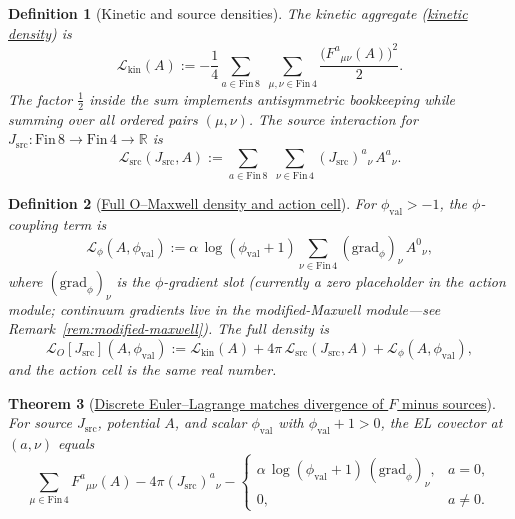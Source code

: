 \documentclass[11pt]{amsart}
\newtheorem{theorem}{Theorem}[section]
\newtheorem{definition}[theorem]{Definition}
\begin{document}
\begin{definition}[Kinetic and source densities]
\label{def:kinetic-source}
The kinetic aggregate (\hyperref[lean:LO-kinetic]{kinetic density}) is
\begin{equation}
\label{eq:Lkin-expanded}
\mathcal{L}_{\mathrm{kin}}(A)
:= -\frac14 \sum_{a\in \mathrm{Fin}\,8}\;\sum_{\mu,\nu\in \mathrm{Fin}\,4}
\frac{\bigl(F^a{}_{\mu\nu}(A)\bigr)^2}{2}.
\end{equation}
The factor \(\tfrac12\) inside the sum implements antisymmetric bookkeeping while summing over all ordered pairs \((\mu,\nu)\). The source interaction for \(J_{\mathrm{src}} : \mathrm{Fin}\,8 \to \mathrm{Fin}\,4 \to \mathbb{R}\) is
\begin{equation}
\label{eq:Lsource-expanded}
\mathcal{L}_{\mathrm{src}}(J_{\mathrm{src}},A)
:= \sum_{a\in \mathrm{Fin}\,8}\;\sum_{\nu\in \mathrm{Fin}\,4} (J_{\mathrm{src}})^a{}_\nu\, A^a{}_\nu .
\end{equation}
\end{definition}

\begin{definition}[\texorpdfstring{\hyperref[lean:LO-Maxwell]{Full O--Maxwell density and action cell}}{Full O-Maxwell density and action cell}]
\label{def:LOmaxwell}
For \(\phi_{\mathrm{val}}>-1\), the \(\phi\)-coupling term is
\[
\mathcal{L}_\phi(A,\phi_{\mathrm{val}})
:= \alpha\,\log(\phi_{\mathrm{val}}+1)\sum_{\nu\in \mathrm{Fin}\,4} (\mathrm{grad}_\phi)_\nu\, A^0{}_\nu ,
\]
where \((\mathrm{grad}_\phi)_\nu\) is the \(\phi\)-gradient slot (currently a zero placeholder in the action module; continuum gradients live in the modified-Maxwell module---see Remark~\ref{rem:modified-maxwell}). The full density is
\[
\mathcal{L}_O[J_{\mathrm{src}}](A,\phi_{\mathrm{val}})
:= \mathcal{L}_{\mathrm{kin}}(A) + 4\pi\,\mathcal{L}_{\mathrm{src}}(J_{\mathrm{src}},A) + \mathcal{L}_\phi(A,\phi_{\mathrm{val}}),
\]
and the \emph{action cell} is the same real number.
\end{definition}

\begin{theorem}[\texorpdfstring{\hyperref[lean:EL-divergence]{Discrete Euler--Lagrange matches divergence of \(F\) minus sources}}{Discrete Euler-Lagrange matches divergence of F minus sources}]
\label{thm:EL}
For source \(J_{\mathrm{src}}\), potential \(A\), and scalar \(\phi_{\mathrm{val}}\) with \(\phi_{\mathrm{val}}+1>0\), the EL covector at \((a,\nu)\) equals
\[
\sum_{\mu\in \mathrm{Fin}\,4} F^a{}_{\mu\nu}(A) - 4\pi (J_{\mathrm{src}})^a{}_\nu
-\begin{cases}
\alpha\,\log(\phi_{\mathrm{val}}+1)\,(\mathrm{grad}_\phi)_\nu, & a=0,\\
0, & a\neq 0 .
\end{cases}
\]
\end{theorem}
\end{document}
